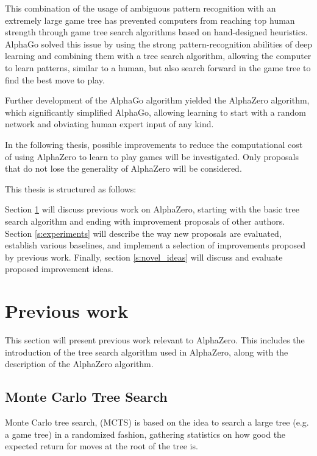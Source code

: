 \documentclass[12pt,onecolumn,oneside,titlepage]{article}
\begin{document}
This combination of the usage of ambiguous pattern recognition with an extremely large game tree has prevented computers from reaching top human strength through game tree search algorithms based on hand-designed heuristics.
AlphaGo solved this issue by using the strong pattern-recognition abilities of deep learning and combining them with a tree search algorithm, allowing the computer to learn patterns, similar to a human, but also search forward in the game tree to find the best move to play.

Further development of the AlphaGo algorithm yielded the AlphaZero algorithm, which significantly simplified AlphaGo, allowing learning to start with a random network and obviating human expert input of any kind.

In the following thesis, possible improvements to reduce the computational cost of using AlphaZero to learn to play games will be investigated. Only proposals that do not lose the generality of AlphaZero will be considered.

This thesis is structured as follows:

Section \ref{sec:prev_work} will discuss previous work on AlphaZero, starting with the basic tree search algorithm and ending with improvement proposals of other authors.
Section \ref{s:experiments} will describe the way new proposals are evaluated, establish various baselines, and implement a selection of improvements proposed by previous work.
Finally, section \ref{s:novel_ideas} will discuss and evaluate proposed improvement ideas.

\pagebreak

\section{Previous work} \label{sec:prev_work}

This section will present previous work relevant to AlphaZero. This includes the introduction of the tree search algorithm used in AlphaZero, along with the description of the AlphaZero algorithm.

\subsection{Monte Carlo Tree Search}
\label{s:mcts}

Monte Carlo tree search, (MCTS) is based on the idea to search a large tree (e.g. a game tree) in a randomized fashion, gathering statistics on how good the expected return for moves at the root of the tree is.
\end{document}
